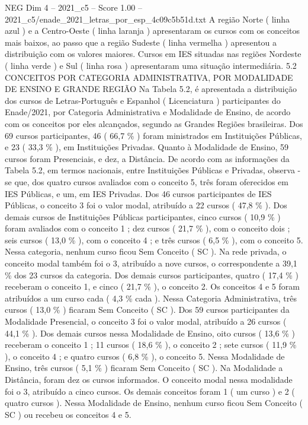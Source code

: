 \begin{textsample}{NEG Dim 4 – 2021\_c5 – Score 1.00 – 2021\_c5/enade\_2021\_letras\_por\_esp\_4c09c5b51d.txt}
A região Norte ( linha azul ) e a Centro-Oeste ( linha laranja ) apresentaram os cursos com os conceitos mais baixos, ao passo que a região Sudeste ( linha vermelha ) apresentou a distribuição com os valores maiores.
Cursos em IES situadas nas regiões Nordeste ( linha verde ) e Sul ( linha rosa ) apresentaram uma situação intermediária. 5.2 CONCEITOS POR CATEGORIA ADMINISTRATIVA, POR MODALIDADE DE ENSINO E GRANDE REGIÃO Na Tabela 5.2, é apresentada a distribuição dos cursos de Letras-Português e Espanhol ( Licenciatura ) participantes do Enade/2021, por Categoria Administrativa e Modalidade de Ensino, de acordo com os conceitos por eles alcançados, segundo as Grandes Regiões brasileiras.
Dos 69 cursos participantes, 46 ( 66,7 \% ) foram ministrados em Instituições Públicas, e 23 ( 33,3 \% ), em Instituições Privadas.
Quanto à Modalidade de Ensino, 59 cursos foram Presenciais, e dez, a Distância.
De acordo com as informações da Tabela 5.2, em termos nacionais, entre Instituições Públicas e Privadas, observa -se que, dos quatro cursos avaliados com o conceito 5, três foram oferecidos em IES Públicas, e um, em IES Privadas.
Dos 46 cursos participantes de IES Públicas, o conceito 3 foi o valor modal, atribuído a 22 cursos ( 47,8 \% ).
Dos demais cursos de Instituições Públicas participantes, cinco cursos ( 10,9 \% ) foram avaliados com o conceito 1 ; dez cursos ( 21,7 \% ), com o conceito dois ; seis cursos ( 13,0 \% ), com o conceito 4 ; e três cursos ( 6,5 \% ), com o conceito 5.
Nessa categoria, nenhum curso ficou Sem Conceito ( SC ).
Na rede privada, o conceito modal também foi o 3, atribuído a nove cursos, o correspondente a 39,1 \% dos 23 cursos da categoria.
Dos demais cursos participantes, quatro ( 17,4 \% ) receberam o conceito 1, e cinco ( 21,7 \% ), o conceito 2.
Os conceitos 4 e 5 foram atribuídos a um curso cada ( 4,3 \% cada ).
Nessa Categoria Administrativa, três cursos ( 13,0 \% ) ficaram Sem Conceito ( SC ).
Dos 59 cursos participantes da Modalidade Presencial, o conceito 3 foi o valor modal, atribuído a 26 cursos ( 44,1 \% ).
Dos demais cursos nessa Modalidade de Ensino, oito cursos ( 13,6 \% ) receberam o conceito 1 ; 11 cursos ( 18,6 \% ), o conceito 2 ; sete cursos ( 11,9 \% ), o conceito 4 ; e quatro cursos ( 6,8 \% ), o conceito 5.
Nessa Modalidade de Ensino, três cursos ( 5,1 \% ) ficaram Sem Conceito ( SC ).
Na Modalidade a Distância, foram dez os cursos informados.
O conceito modal nessa modalidade foi o 3, atribuído a cinco cursos.
Os demais conceitos foram 1 ( um curso ) e 2 ( quatro cursos ).
Nessa Modalidade de Ensino, nenhum curso ficou Sem Conceito ( SC ) ou recebeu os conceitos 4 e 5.

\end{textsample}
